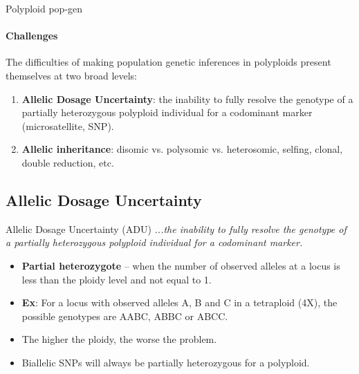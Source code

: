 \documentclass[presentation]{beamer}
\begin{document}
\begin{frame}[t]{Polyploid pop-gen}
\framesubtitle{Challenges}
	The difficulties of making population genetic inferences in polyploids present themselves at two broad levels:
	\vspace{0.1in}
	
	\begin{enumerate}
		\item \textbf{Allelic Dosage Uncertainty}: the inability to fully resolve the genotype of a partially heterozygous polyploid individual for a codominant marker (microsatellite, SNP).
		\vspace{0.2in}
		
		\item \textbf{Allelic inheritance}: disomic vs. polysomic vs. heterosomic, selfing, clonal, double reduction, etc.
	\end{enumerate}


\end{frame}

\subsection{Allelic Dosage Uncertainty}

\begin{frame}[t]{Allelic Dosage Uncertainty (ADU)}
	\textit{...the inability to fully resolve the genotype of a partially heterozygous polyploid individual for a codominant marker.}
	\vspace{0.1in}
	
	\begin{itemize}
		\item \textbf{Partial heterozygote} -- when the number of observed alleles at a locus is less than the ploidy level and not equal to 1.
		\vspace{0.1in}

		\item \textbf{Ex}: For a locus with observed alleles A, B and C in a tetraploid (4X), the possible genotypes are AABC, ABBC or ABCC.
		\vspace{0.1in}
		
		\item The higher the ploidy, the worse the problem.
		\vspace{0.1in}
		
		\item Biallelic SNPs will always be partially heterozygous for a polyploid.
		
	\end{itemize}
	
\end{frame}
\end{document}
